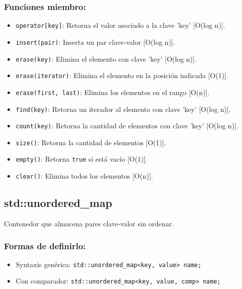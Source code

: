 \subsubsection*{Funciones miembro:}
\begin{itemize}
  \item \texttt{operator[key]}: Retorna el valor asociado a la clave 'key' [O(log n)].
  \item \texttt{insert(pair)}: Inserta un par clave-valor [O(log n)]. 
  \item \texttt{erase(key)}: Elimina el elemento con clave 'key' [O(log n)].
  \item \texttt{erase(iterator)}: Elimina el elemento en la posición indicada [O(1)].
  \item \texttt{erase(first, last)}: Elimina los elementos en el rango [O(n)].
  \item \texttt{find(key)}: Retorna un iterador al elemento con clave 'key' [O(log n)]. 
  \item \texttt{count(key)}: Retorna la cantidad de elementos con clave 'key' [O(log n)]. 
  \item \texttt{size()}: Retorna la cantidad de elementos [O(1)]. 
  \item \texttt{empty()}: Retorna \texttt{true} si está vacío [O(1)]. 
  \item \texttt{clear()}: Elimina todos los elementos [O(n)]. 
\end{itemize}

\subsection{std::unordered\_map}
\label{subsec:std_unordered_map}
Contenedor que almacena pares clave-valor sin ordenar. 

\subsubsection*{Formas de definirlo:}
\begin{itemize}
  \item Syntaxis genérica: \texttt{std::unordered\_map<key, value> name;}
  \item Con comparador: \texttt{std::unordered\_map<key, value, comp> name;}
\end{itemize}

